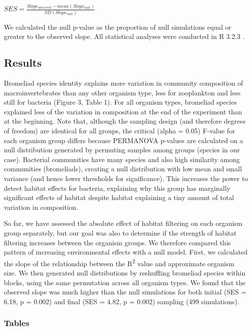 \(SES = \frac{Slope_{observed} - mean(Slope_{null})}{SD(Slope_{null})}\)

We calculated the null p-value as the proportion of null simulations
equal or greater to the observed slope. All statistical analyses were
conducted in R 3.2.3 \citep{rcore}.

\subsection{Results}\label{results}

Bromeliad species identity explains more variation in community
composition of macroinvertebrates than any other organism type, less for
zooplankton and less still for bacteria (Figure 3, Table 1). For all
organism types, bromeliad species explained less of the variation in
composition at the end of the experiment than at the beginning. Note
that, although the sampling design (and therefore degrees of freedom)
are identical for all groups, the critical (alpha = 0.05) F-value for
each organism group differs because PERMANOVA p-values are calculated on
a null distribution generated by permuting samples among groups (species
in our case). Bacterial communities have many species and also high
similarity among communities (bromeliads), creating a null distribution
with low mean and small variance (and hence lower thresholds for
significance). This increases the power to detect habitat effects for
bacteria, explaining why this group has marginally significant effects
of habitat despite habitat explaining a tiny amount of total variation
in composition.

So far, we have assessed the absolute effect of habitat filtering on
each organism group separately, but our goal was also to determine if
the strength of habitat filtering increases between the organism groups.
We therefore compared this pattern of increasing environmental effects
with a null model. First, we calculated the slope of the relationship
between the R\textsuperscript{2} value and approximate organism size. We
then generated null distributions by reshuffling bromeliad species
within blocks, using the same permutation across all organism types. We
found that the observed slope was much higher than the null simulations
for both initial (SES = 6.18, p = 0.002) and final (SES = 4.82, p =
0.002) sampling (499 simulations).

\subsubsection{Tables}\label{tables}

